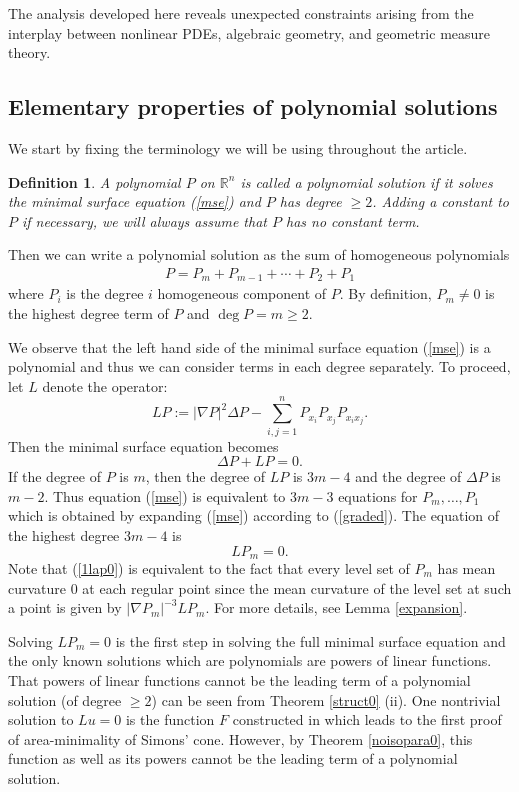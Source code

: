 \documentclass[pdflatex,sn-mathphys-num]{sn-jnl}%
\theoremstyle{thmstyleone}%
\theoremstyle{thmstyletwo}%
\theoremstyle{thmstylethree}%
\newtheorem{definition}{Definition}%
\newcommand{\R}{\mathbb{R}}
\begin{document}
The analysis developed here reveals unexpected constraints arising from the interplay between nonlinear PDEs, algebraic geometry, and geometric measure theory.



\subsection{Elementary properties of polynomial solutions}
We start by fixing the terminology we will be using throughout the article.

\begin{definition}\label{polynomial.solution}
	A polynomial $P$ on $\R^n$ is called a \textit{polynomial solution} if it solves the minimal surface equation (\ref{mse}) and $P$ has degree $\ge 2$. Adding a constant to $P$ if necessary, we will always assume that $P$ has no constant term. 
\end{definition}
Then we can write a polynomial solution as the sum of homogeneous polynomials 
\begin{align}
	\label{graded}
	P=P_m+P_{m-1}+\cdots+P_2+P_1
\end{align} where $P_i$ is the degree $i$ homogeneous component of $P$. By definition, $P_m\neq0$ is the highest degree term of $P$ and $\deg P=m\ge 2$.



We observe that the left hand side of the minimal surface equation (\ref{mse}) is a polynomial and thus we can consider terms in each degree separately. To proceed, let $L$ denote the operator: \[LP:=|\nabla P|^2\Delta P-\sum_{i,j=1}^nP_{x_i}P_{x_j}P_{x_ix_j}.\] 
Then the minimal surface equation becomes
\[
\Delta P+LP=0.
\]
If the degree of $P$ is $m$, then the degree of $LP$ is $3m-4$ and the degree of $\Delta P$ is $m-2$. Thus equation (\ref{mse}) is equivalent to $3m-3$ equations for $P_m,\dots,P_1$ which is obtained by expanding (\ref{mse}) according to (\ref{graded}). The equation of the highest degree $3m-4$ is
\begin{equation}
	LP_m=0.\label{1lap0}
\end{equation}
Note that (\ref{1lap0}) is equivalent to the fact that every level set of $P_m$ has mean curvature 0 at each regular point since the mean curvature of the level set at such a point is given by $|\nabla P_m|^{-3}L P_m$. For more details, see Lemma \ref{expansion}.

Solving $LP_m=0$ is the first step in solving the full minimal surface equation and the only known solutions which are polynomials are powers of linear functions. That powers of linear functions cannot be the leading term of a polynomial solution (of degree $\ge 2$) can be seen from Theorem \ref{struct0} (ii).
One nontrivial solution to $Lu=0$ is the function $F$ constructed in \cite[Section III]{bombieri1969minimal} which leads to the first proof of area-minimality of Simons' cone. However, by Theorem \ref{noisopara0}, this function as well as its powers cannot be the leading term of a polynomial solution.
\end{document}
